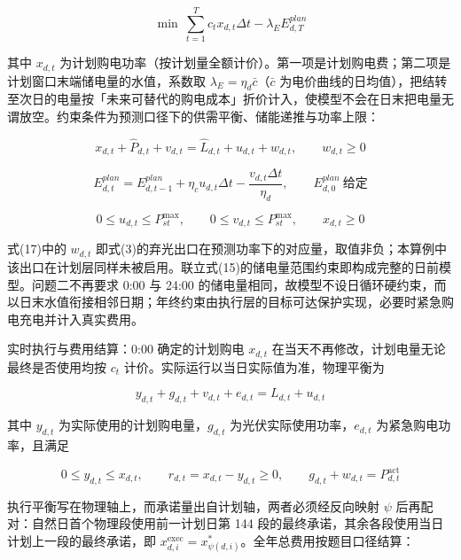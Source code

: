 \documentclass[12pt,a4paper]{ctexart}
\begin{document}
\begin{equation}
\min\ \sum_{t=1}^{T} c_t x_{d,t}\Delta t-\lambda_E E^{plan}_{d,T}
\end{equation}

其中 $x_{d,t}$ 为计划购电功率（按计划量全额计价）。第一项是计划购电费；第二项是计划窗口末端储电量的水值，系数取 $\lambda_E=\eta_d\bar{c}$（$\bar{c}$ 为电价曲线的日均值），把结转至次日的电量按「未来可替代的购电成本」折价计入，使模型不会在日末把电量无谓放空。约束条件为预测口径下的供需平衡、储能递推与功率上限：

\begin{equation}
x_{d,t}+\widehat{P}_{d,t}+v_{d,t}=\widehat{L}_{d,t}+u_{d,t}+w_{d,t},\qquad w_{d,t}\ge0
\end{equation}

\begin{equation}
E^{plan}_{d,t}=E^{plan}_{d,t-1}+\eta_c u_{d,t}\Delta t-\frac{v_{d,t}\Delta t}{\eta_d},\qquad E^{plan}_{d,0}\ \text{给定}
\end{equation}

\begin{equation}
0\le u_{d,t}\le P_{st}^{\max},\qquad 0\le v_{d,t}\le P_{st}^{\max},\qquad x_{d,t}\ge0
\end{equation}

式(17)中的 $w_{d,t}$ 即式(3)的弃光出口在预测功率下的对应量，取值非负；本算例中该出口在计划层同样未被启用。联立式(15)的储电量范围约束即构成完整的日前模型。问题二不再要求 0:00 与 24:00 的储电量相同，故模型不设日循环硬约束，而以日末水值衔接相邻日期；年终约束由执行层的目标可达保护实现，必要时紧急购电充电并计入真实费用。

实时执行与费用结算：0:00 确定的计划购电 $x_{d,t}$ 在当天不再修改，计划电量无论最终是否使用均按 $c_t$ 计价。实际运行以当日实际值为准，物理平衡为

\begin{equation}
y_{d,t}+g_{d,t}+v_{d,t}+e_{d,t}=L_{d,t}+u_{d,t}
\end{equation}

其中 $y_{d,t}$ 为实际使用的计划购电量，$g_{d,t}$ 为光伏实际使用功率，$e_{d,t}$ 为紧急购电功率，且满足

\begin{equation}
0\le y_{d,t}\le x_{d,t},\qquad r_{d,t}=x_{d,t}-y_{d,t}\ge0,\qquad g_{d,t}+w_{d,t}=P_{d,t}^{\mathrm{act}}
\end{equation}

执行平衡写在物理轴上，而承诺量出自计划轴，两者必须经反向映射 $\psi$ 后再配对：自然日首个物理段使用前一计划日第 144 段的最终承诺，其余各段使用当日计划上一段的最终承诺，即 $x_{d,i}^{\mathrm{exec}}=x_{\psi(d,i)}^{*}$。全年总费用按题目口径结算：
\end{document}

